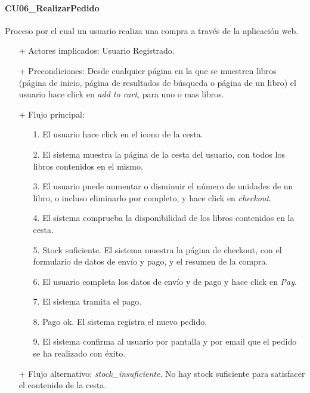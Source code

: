 \documentclass[a4paper]{article}
\begin{document}
            \paragraph{CU06\_RealizarPedido}
                Proceso por el cual un usuario realiza una compra a través de la aplicación web.
                \begin{itemize}
                    \item[+] Actores implicados: Usuario Registrado.
                    \item[+] Precondiciones: Desde cualquier página en la que se muestren libros (página de inicio, página de resultados de búsqueda o página de un libro) el usuario hace click en \emph{add to cart}, para uno o mas libros.
                    \item[+] Flujo principal:
                    \begin{enumerate}
                        \item[1.] El usuario hace click en el icono de la cesta.
                        \item[2.] El sistema muestra la página de la cesta del usuario, con todos los libros contenidos en el mismo.
                        \item[3.] El usuario puede aumentar o disminuir el número de unidades de un libro, o incluso eliminarlo por completo, y hace click en \emph{checkout}.
                        \item[4.] El sistema comprueba la disponibilidad de los libros contenidos en la cesta.
                        \item[5.] Stock suficiente. El sistema muestra la página de checkout, con el formulario de datos de envío y pago, y el resumen de la compra.
                        \item[6.] El usuario completa los datos de envío y de pago y hace click en \emph{Pay}.
                        \item[7.] El sistema tramita el pago.
                        \item[8.] Pago ok. El sistema registra el nuevo pedido.
                        \item[9.] El sistema confirma al usuario por pantalla y por email que el pedido se ha realizado con éxito.
                    \end{enumerate}
                    \item[+] Flujo alternativo: \emph{stock\_insuficiente}. No hay stock suficiente para satisfacer el contenido de la cesta.
                    \begin{itemize}

\end{itemize}
\end{itemize}
\end{document}
